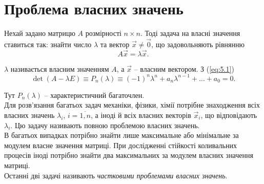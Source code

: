 \section{Проблема власних значень}

Нехай задано матрицю $A$ розмірності $n \times n$. Тоді задача на власні значення ставиться так: знайти число $\lambda$ та вектор $\vec x \ne \vec 0$, що задовольняють рівнянню
\begin{equation}
	\label{eq:5.1}
	A \vec x = \lambda \vec x.
\end{equation}

$\lambda$ називається власним значенням $A$, а $\vec x$ -- власним вектором. З (\ref{eq:5.1}) \[ \det (A - \lambda E) \equiv P_n(\lambda) \equiv (-1)^n \lambda^n + a_n \lambda^{n-1} + \ldots + a_0 = 0. \]

Тут $P_n(\lambda)$ -- характеристичний багаточлен. \\

Для розв’язання багатьох задач механіки, фізики, хімії потрібне знаходження всіх власних значень $\lambda_i$, $i=\overline{1,n}$, а іноді й всіх власних векторів $\vec x_i$, що відповідають $\lambda_i$. Цю задачу називають повною проблемою власних значень. \\

В багатьох випадках потрібно знайти лише максимальне або мінімальне за модулем власне значення матриці. При дослідженні стійкості коливальних процесів іноді потрібно знайти два максимальних за модулем власних значення матриці. \\

Останні дві задачі називають \textit{частковими проблемами власних значень}.


